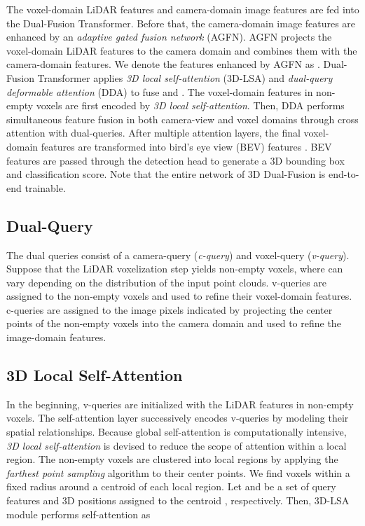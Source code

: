 \documentclass[lettersize,journal]{IEEEtran}
\begin{document}
The voxel-domain LiDAR features  and camera-domain image features  are fed into the Dual-Fusion Transformer. Before that, the camera-domain image features  are enhanced by an {\it adaptive gated fusion network} (AGFN). AGFN projects the voxel-domain LiDAR features to the camera domain and combines them with the camera-domain features. We denote the features enhanced by AGFN as .
Dual-Fusion Transformer applies {\it 3D local self-attention} (3D-LSA) and {\it dual-query deformable attention} (DDA) to fuse   and . The voxel-domain features in non-empty voxels are first encoded by {\it 3D local self-attention}. Then, DDA performs simultaneous feature fusion in both camera-view and voxel domains through cross attention with dual-queries.  After multiple attention layers, the final voxel-domain features are transformed into bird's eye view (BEV) features \cite{second}.  BEV features are passed through the detection head to generate a 3D bounding box and classification score.
Note that the entire network of 3D Dual-Fusion is end-to-end trainable.







\subsection{Dual-Query}
The dual queries consist of a camera-query ({\it c-query}) and  voxel-query ({\it v-query}).
Suppose that the LiDAR voxelization step yields  non-empty voxels, where  can vary depending on the distribution of the input point clouds.  v-queries  are assigned to the non-empty voxels and used to refine their voxel-domain features.  c-queries  are assigned to  the image pixels indicated by projecting the center points of the non-empty voxels into the camera domain and used to refine the image-domain features.  





\subsection{3D Local Self-Attention}
In the beginning, v-queries are initialized with the LiDAR features in non-empty voxels. The self-attention layer successively encodes v-queries by modeling their spatial relationships. Because global self-attention is computationally intensive,  {\it 3D local self-attention} is devised to reduce the scope of attention within a local region. The non-empty voxels are clustered into local regions by applying the {\it farthest point sampling} algorithm \cite{pointnet++} to their center points. We find  voxels within a fixed radius around a centroid of each local region. Let  and  be a set of query features and 3D positions assigned to the centroid , respectively. Then, 3D-LSA module performs self-attention as
\end{document}
